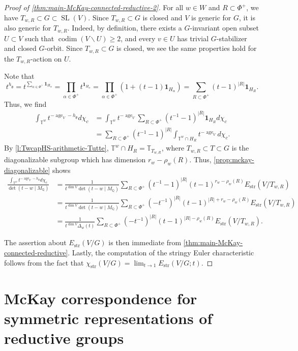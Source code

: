 \documentclass[12pt,a4paper]{amsart}
\theoremstyle{definition}
\renewcommand{\setminus}{\smallsetminus}
\newcommand{\TT}{\mathbb T}
\newcommand{\QQ}{\mathbb{Q}}
\newcommand{\g}{\mathfrak{g}}
\newcommand{\str}{\mathrm{str}}
\renewcommand{\1}{\textbf{1}}
\newcommand{\<}{\langle}
\renewcommand{\>}{\rangle}
\DeclareMathOperator{\codim}{codim}
\DeclareMathOperator{\age}{age}
\DeclareMathOperator{\SL}{SL}
\begin{document}
\begin{proof}[{Proof of \autoref{thm:main-McKay-connected-reductive-2}}]
For all $w\in W$ and $R\subset\Phi^+$, we have $T_{w,R}\subset G\subset\SL(V)$. Since $T_{w,R}\subset G$ is closed and $V$ is generic for $G$, it is also generic for $T_{w,R}$. Indeed, by definition, there exists a $G$-invariant open subset $U\subset V$ such that $\codim(V\setminus U)\geq2$, and every $v\in U$ has trivial $G$-stabilizer and closed $G$-orbit. Since $T_{w,R}\subset G$ is closed, we see the same properties hold for the $T_{w,R}$-action on $U$.

Note that
\[
	t^{h_\g}=t^{\sum_{\alpha\in\Phi^+} \1_{H_\alpha}} =\prod_{\alpha\in\Phi^+} t^{\1_{H_\alpha}}=\prod_{\alpha\in\Phi^+} (1+(t-1)\1_{H_\alpha})=\sum_{R\subset\Phi^+}(t-1)^{|R|}\1_{H_R}.
\]
Thus, we find
\begin{align*}
	\int_{\TT^w}t^{-\age_V-h_\g}d\chi_c &=\int_{\TT^w}t^{-\age_V}\sum_{R\subset\Phi^+}(t^{-1}-1)^{|R|}\1_{H_{R}}d\chi_c\\
	&=\sum_{R\subset\Phi^+}(t^{-1}-1)^{|R|}\int_{\TT^w\cap H_R}t^{-\age_V}d\chi_c.
\end{align*}
By \autoref{l:TwcapHS-arithmetic-Tutte}, $\TT^w\cap H_R=\TT_{T_{w,R}}$, where $T_{w,R}\subset T\subset G$ is the diagonalizable subgroup which has dimension $r_w-\rho_w(R)$. Thus, \autoref{prop:mckay-diagonalizable} shows
\begin{align*}
	\frac{\int_{\TT^w}t^{-\age_V-h_\g}d\chi_c}{\det(t-w\mid M_\QQ)} &= \frac{1}{t^{\dim V}\det(t-w\mid M_\QQ)}\sum_{R\subset\Phi^+}(t^{-1}-1)^{|R|}(t-1)^{r_w-\rho_w(R)}E_{\str}(V/T_{w,R})\\
	&= \frac{1}{t^{\dim V}\det(t-w\mid M_\QQ)}\sum_{R\subset\Phi^+}(-t^{-1})^{|R|}(t-1)^{|R|+r_w-\rho_w(R)}E_{\str}(V/T_{w,R})\\
	&= \frac{1}{t^{\dim V}\Delta_w(t)}\sum_{R\subset\Phi^+}(-t^{-1})^{|R|}(t-1)^{|R|-\rho_w(R)}E_{\str}(V/T_{w,R}).
\end{align*}

The assertion about $E_{\str}(V/G)$ is then immediate from \autoref{thm:main-McKay-connected-reductive}. Lastly, the computation of the stringy Euler characteristic follows from the fact that $\chi_{\str}(V/G)=\lim_{t\to1}E_{\str}(V/G;t)$.
\end{proof}











\section{McKay correspondence for symmetric representations of reductive groups}
\end{document}
